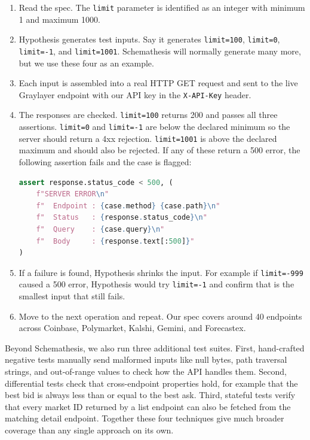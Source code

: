 \documentclass[12pt]{article}
\begin{document}
\begin{enumerate}
  \item Read the spec. The \texttt{limit} parameter is identified
  as an integer with minimum 1 and maximum 1000.

  \item Hypothesis generates test inputs. Say it generates
  \texttt{limit=100}, \texttt{limit=0}, \texttt{limit=-1}, and
  \texttt{limit=1001}. Schemathesis will normally generate many
  more, but we use these four as an example.

  \item Each input is assembled into a real HTTP GET request and
  sent to the live Graylayer endpoint with our API key in the
  \texttt{X-API-Key} header.

  \item The responses are checked. \texttt{limit=100} returns 200
  and passes all three assertions. \texttt{limit=0} and
  \texttt{limit=-1} are below the declared minimum so the server
  should return a 4xx rejection. \texttt{limit=1001} is above the
  declared maximum and should also be rejected. If any of these
  return a 500 error, the following assertion fails and the case
  is flagged:

\begin{lstlisting}[language=Python]
assert response.status_code < 500, (
    f"SERVER ERROR\n"
    f"  Endpoint : {case.method} {case.path}\n"
    f"  Status   : {response.status_code}\n"
    f"  Query    : {case.query}\n"
    f"  Body     : {response.text[:500]}"
)
\end{lstlisting}

  \item If a failure is found, Hypothesis shrinks the input. For
  example if \texttt{limit=-999} caused a 500 error, Hypothesis
  would try \texttt{limit=-1} and confirm that is the smallest
  input that still fails.

  \item Move to the next operation and repeat. Our spec covers
  around 40 endpoints across Coinbase, Polymarket, Kalshi, Gemini,
  and Forecastex.
\end{enumerate}

Beyond Schemathesis, we also run three additional test suites.
First, hand-crafted negative tests manually send malformed inputs
like null bytes, path traversal strings, and out-of-range values
to check how the API handles them. Second, differential tests check
that cross-endpoint properties hold, for example that the best bid
is always less than or equal to the best ask. Third, stateful tests
verify that every market ID returned by a list endpoint can also be
fetched from the matching detail endpoint. Together these four
techniques give much broader coverage than any single approach on
its own.
\end{document}
